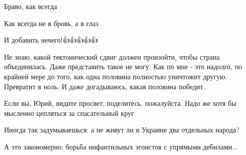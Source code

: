 \begin{itemize}
Браво, как всегда👏

 
Как всегда не в бровь, а в глаз👍🏻

 
И добавить нечего!👍👍👍👍👍

 

Не знаю, какой тектонический сдвиг должен произойти, чтобы страна объединилась.
Даже представить такое не могу. Как по мне - это надолго, по крайней мере до
того, как одна половина полностью уничтожит другую. Превратит в ноль. И даже
догадываюсь, какая половина победит

Если вы, Юрий, видите просвет, поделитесь, пожалуйста. Надо же хотя бы мысленно
цепляться за спасательный круг

 
Иногда так задумываешься: а не живут ли в Украине два отдельных народа?

 
А это закономерно; борьба инфантильных эгоистов с упрямыми дебилами...

 


\end{itemize}
